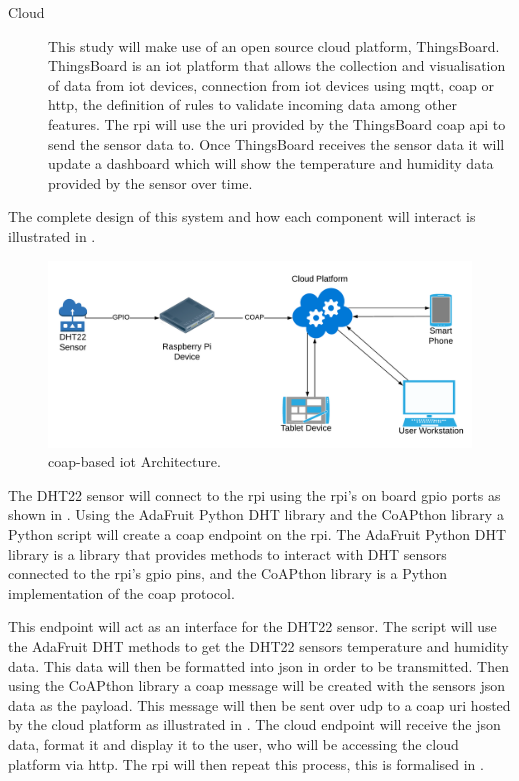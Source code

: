 \begin{description}
    \item[Cloud]
    This study will make use of an open source cloud platform, ThingsBoard.
    ThingsBoard is an \gls{iot} platform that allows the collection and 
    visualisation of data from \gls{iot} devices, connection from \gls{iot} devices
    using \gls{mqtt}, \gls{coap} or \gls{http}, the definition of rules to validate
    incoming data among other features. The \gls{rpi} will use the \gls{uri} 
    provided by the ThingsBoard \gls{coap} \gls{api} to send the sensor data to.
    Once ThingsBoard receives the sensor data it will update a dashboard which
    will show the temperature and humidity data provided by the sensor over time.

\end{description}

The complete design of this system and how each component will interact
is illustrated in .

\begin{figure}[H]
    \centering
    \includegraphics[width=\imageWidth\textwidth]{assets/Project_Framework.png}
    \caption{\label{fig:coap_iot_architecture} \gls{coap}-based \gls{iot} Architecture.}
\end{figure}


The DHT22 sensor will connect to the \gls{rpi} using the \gls{rpi}'s on board 
\gls{gpio} ports as shown in . 
Using the AdaFruit Python DHT library and the CoAPthon library a Python script 
will create a \gls{coap} endpoint on the \gls{rpi}.
The AdaFruit Python DHT library is a library that provides methods to interact 
with DHT sensors connected to the \gls{rpi}'s \gls{gpio} pins, 
and the CoAPthon library is a Python implementation of the \gls{coap} protocol.

This endpoint will act as an interface for the DHT22 sensor. 
The script will use the AdaFruit DHT methods to get the DHT22 sensors temperature 
and humidity data. This data will then be formatted into \gls{json} in order to 
be transmitted. Then using the CoAPthon library a \gls{coap} message will be created 
with the sensors \gls{json} data as the payload. This message will then be sent over
\gls{udp} to a \gls{coap} \gls{uri} hosted by the cloud platform as illustrated in 
. 
The cloud endpoint will receive the \gls{json} data, format it and display it 
to the user, who will be accessing the cloud platform via \gls{http}. 
The \gls{rpi} will then repeat this process, this is formalised 
in .

